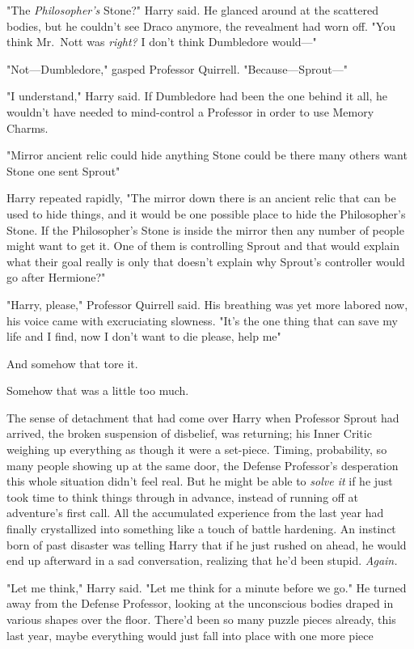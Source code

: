 "The \emph{Philosopher's} Stone?" Harry said. He glanced around at the
scattered bodies, but he couldn't see Draco anymore, the revealment had worn
off. "You think Mr.~Nott was \emph{right?} I don't think Dumbledore would\mbox{---}"

"Not---Dumbledore," gasped Professor Quirrell. "Because---Sprout\mbox{---}"

"I understand," Harry said. If Dumbledore had been the one behind it all, he
wouldn't have needed to mind-control a Professor in order to use Memory Charms.

"Mirror{\el} ancient relic{\el} could hide anything{\el} Stone could
be there{\el} many others want Stone{\el} one sent Sprout{\el}"

Harry repeated rapidly, "The mirror down there is an ancient relic that can be
used to hide things, and it would be one possible place to hide the
Philosopher's Stone. If the Philosopher's Stone is inside the mirror then any
number of people might want to get it. One of them is controlling Sprout and
that would explain what their goal really is{\el} only{\el} that doesn't
explain why Sprout's controller would go after Hermione?"

"Harry, please," Professor Quirrell said. His breathing was yet more labored
now, his voice came with excruciating slowness. "It's the one thing{\el}
that can save my life{\el} and I find, now{\el} I don't want to
die{\el} please, help me{\el}"

And somehow that tore it.

Somehow that was a little too much.

The sense of detachment that had come over Harry when Professor Sprout had
arrived, the broken suspension of disbelief, was returning; his Inner Critic
weighing up everything as though it were a set-piece. Timing, probability, so
many people showing up at the same door, the Defense Professor's
desperation{\el} this whole situation didn't feel real. But he might be able
to \emph{solve it} if he just took time to think things through in advance,
instead of running off at adventure's first call. All the accumulated
experience from the last year had finally crystallized into something like a
touch of battle hardening. An instinct born of past disaster was telling Harry
that if he just rushed on ahead, he would end up afterward in a sad
conversation, realizing that he'd been stupid. \emph{Again.}

"Let me think," Harry said. "Let me think for a minute before we go." He turned
away from the Defense Professor, looking at the unconscious bodies draped in
various shapes over the floor. There'd been so many puzzle pieces already, this
last year, maybe everything would just fall into place with one more
piece{\el}

